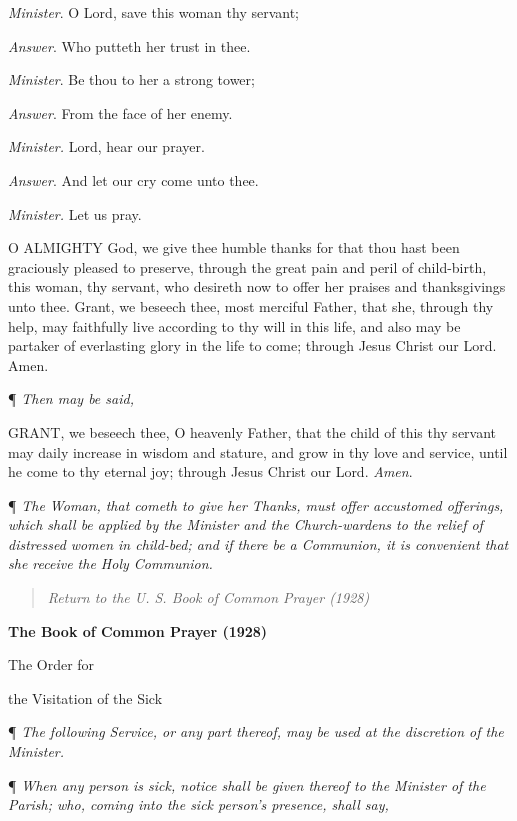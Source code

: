 \emph{Minister}. O Lord, save this woman thy servant;

\emph{Answer}. Who putteth her trust in thee. 

\emph{Minister}. Be thou to her a strong tower; 

\emph{Answer}. From the face of her enemy. 

\emph{Minister.} Lord, hear our prayer. 

\emph{Answer}. And let our cry come unto thee.

\emph{Minister.}
Let us pray.

O
ALMIGHTY God, we give thee humble thanks for that thou hast been graciously
pleased to preserve, through the great pain and peril of child-birth,
this woman, thy servant, who desireth now to offer her praises and thanksgivings
unto thee. Grant, we beseech thee, most merciful Father, that she, through
thy help, may faithfully live according to thy will in this life, and
also may be partaker of everlasting glory in the life to come; through
Jesus Christ our Lord. Amen.

¶
\emph{Then may be said,}

GRANT,
we beseech thee, O heavenly Father, that the child of this thy servant
may daily increase in wisdom and stature, and grow in thy love and service,
until he come to thy eternal joy; through Jesus Christ our Lord. \emph{Amen}.

¶
\emph{The Woman, that cometh to give her Thanks, must offer accustomed offerings,
which shall be applied by the Minister and the Church-wardens to the relief
of distressed women in child-bed; and if there be a Communion, it is convenient
that she receive the Holy Communion.}

\begin{quote}

\emph{Return to the U.
S. Book of Common Prayer (1928)}

\end{quote}


\textbf{The Book of Common Prayer (1928)}

The
Order for 

the Visitation of the Sick

¶
\emph{The following Service, or any part thereof, may be used at the discretion
of the Minister.}

¶ \emph{When any person is sick, notice shall be given thereof to
the Minister of the Parish; who, coming into the sick person's presence,
shall say,}

